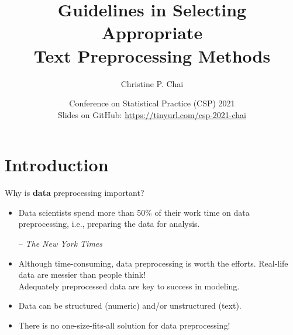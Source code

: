\documentclass{beamer}
\title [Text Preprocessing Methods] %
{Guidelines in Selecting Appropriate\\ Text Preprocessing Methods}
\author [chrchai@microsoft.com] %
{Christine P. Chai}
\institute[]
{Microsoft\\ chrchai@microsoft.com}
\date[tinyurl.com/csp-2021-chai] %
{Conference on Statistical Practice (CSP) 2021\\ \vspace{40pt}
\footnotesize{Slides on GitHub: \url{https://tinyurl.com/csp-2021-chai}}}
\renewcommand{\cite}{\citep}
\begin{document}
\begin{frame}
  \titlepage
\end{frame}




\section{Introduction}

\begin{frame}{Why is \textbf{\color{yellow}data} preprocessing important?}
\begin{itemize}
\item Data scientists spend more than 50\% of their work time on data preprocessing, i.e., preparing the data for analysis.\\
\begin{flushright}
-- \textit{The New York Times}~\cite{lohr2014bigdata}
\end{flushright}
	\bigskip
\item Although time-consuming, data preprocessing is worth the efforts. Real-life data are messier than people think!~\cite{chai2020importance}\\
	Adequately preprocessed data are key to success in modeling.
	\bigskip
\item Data can be structured (numeric) and/or unstructured (text).
\item There is no one-size-fits-all solution for data preprocessing!
\end{itemize}
\end{frame}
\end{document}

